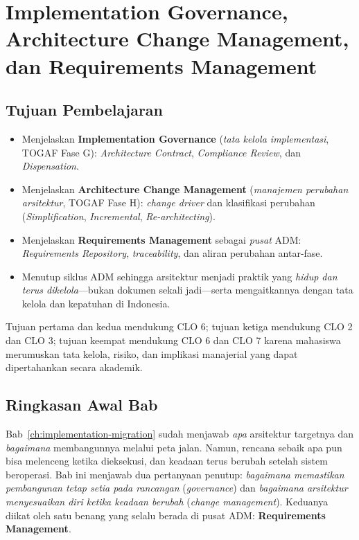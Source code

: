 \chapter[Implementation Governance, Change Management, dan Requirements]{Implementation
Governance, Architecture Change Management, dan Requirements Management}
\label{ch:governance-change}
\setlength{\emergencystretch}{2em}

\section*{Tujuan Pembelajaran}
\begin{itemize}
  \item Menjelaskan \textbf{Implementation Governance} (\emph{tata kelola
        implementasi}, TOGAF Fase G): \emph{Architecture Contract},
        \emph{Compliance Review}, dan \emph{Dispensation}.
  \item Menjelaskan \textbf{Architecture Change Management} (\emph{manajemen
        perubahan arsitektur}, TOGAF Fase H): \emph{change driver} dan klasifikasi
        perubahan (\emph{Simplification}, \emph{Incremental}, \emph{Re-architecting}).
  \item Menjelaskan \textbf{Requirements Management} sebagai \emph{pusat} ADM:
        \emph{Requirements Repository}, \emph{traceability}, dan aliran perubahan
        antar-fase.
  \item Menutup siklus ADM sehingga arsitektur menjadi praktik yang \emph{hidup
        dan terus dikelola}---bukan dokumen sekali jadi---serta mengaitkannya
        dengan tata kelola dan kepatuhan di Indonesia.
\end{itemize}

Tujuan pertama dan kedua mendukung CLO 6; tujuan ketiga mendukung CLO 2 dan
CLO 3; tujuan keempat mendukung CLO 6 dan CLO 7 karena mahasiswa merumuskan tata
kelola, risiko, dan implikasi manajerial yang dapat dipertahankan secara akademik.

\section{Ringkasan Awal Bab}

Bab~\ref{ch:implementation-migration} sudah menjawab \emph{apa} arsitektur
targetnya dan \emph{bagaimana} membangunnya melalui peta jalan. Namun, rencana
sebaik apa pun bisa melenceng ketika dieksekusi, dan keadaan terus berubah setelah
sistem beroperasi. Bab ini menjawab dua pertanyaan penutup: \emph{bagaimana
memastikan pembangunan tetap setia pada rancangan} (\emph{governance}) dan
\emph{bagaimana arsitektur menyesuaikan diri ketika keadaan berubah}
(\emph{change management}). Keduanya diikat oleh satu benang yang selalu berada di
pusat ADM: \textbf{Requirements Management}.

